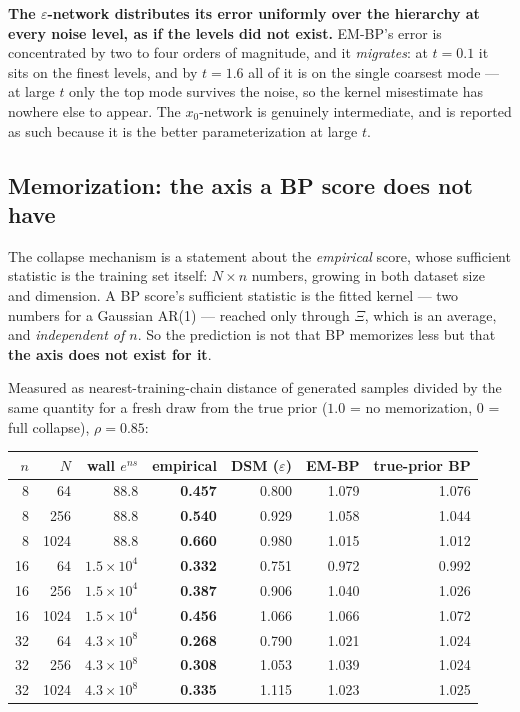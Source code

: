 \documentclass[11pt]{article}
\theoremstyle{remark}
\newcommand{\Xis}{\Xi}
\begin{document}
\textbf{The $\varepsilon$-network distributes its error uniformly over the
hierarchy at every noise level, as if the levels did not exist.} EM-BP's error
is concentrated by two to four orders of magnitude, and it \emph{migrates}: at
$t=0.1$ it sits on the finest levels, and by $t=1.6$ all of it is on the single
coarsest mode --- at large $t$ only the top mode survives the noise, so the
kernel misestimate has nowhere else to appear. The $x_0$-network is genuinely
intermediate, and is reported as such because it is the better parameterization
at large $t$.

\subsection{Memorization: the axis a BP score does not have}

The collapse mechanism is a statement about the \emph{empirical} score, whose
sufficient statistic is the training set itself: $N\times n$ numbers, growing in
both dataset size and dimension. A BP score's sufficient statistic is the fitted
kernel --- two numbers for a Gaussian AR(1) --- reached only through $\Xis$,
which is an average, and \emph{independent of $n$}. So the prediction is not
that BP memorizes less but that \textbf{the axis does not exist for it}.

Measured as nearest-training-chain distance of generated samples divided by the
same quantity for a fresh draw from the true prior ($1.0$ = no memorization,
$0$ = full collapse), $\rho = 0.85$:

\begin{center}
\begin{tabular}{@{}rrrrrrr@{}}
\toprule
$n$ & $N$ & wall $e^{ns}$ & empirical & DSM ($\varepsilon$) & EM-BP & true-prior BP \\
\midrule
8 & 64 & 88.8 & \textbf{0.457} & 0.800 & 1.079 & 1.076 \\
8 & 256 & 88.8 & \textbf{0.540} & 0.929 & 1.058 & 1.044 \\
8 & 1024 & 88.8 & \textbf{0.660} & 0.980 & 1.015 & 1.012 \\
16 & 64 & $1.5\times10^4$ & \textbf{0.332} & 0.751 & 0.972 & 0.992 \\
16 & 256 & $1.5\times10^4$ & \textbf{0.387} & 0.906 & 1.040 & 1.026 \\
16 & 1024 & $1.5\times10^4$ & \textbf{0.456} & 1.066 & 1.066 & 1.072 \\
32 & 64 & $4.3\times10^8$ & \textbf{0.268} & 0.790 & 1.021 & 1.024 \\
32 & 256 & $4.3\times10^8$ & \textbf{0.308} & 1.053 & 1.039 & 1.024 \\
32 & 1024 & $4.3\times10^8$ & \textbf{0.335} & 1.115 & 1.023 & 1.025 \\
\bottomrule
\end{tabular}
\end{center}
\end{document}
